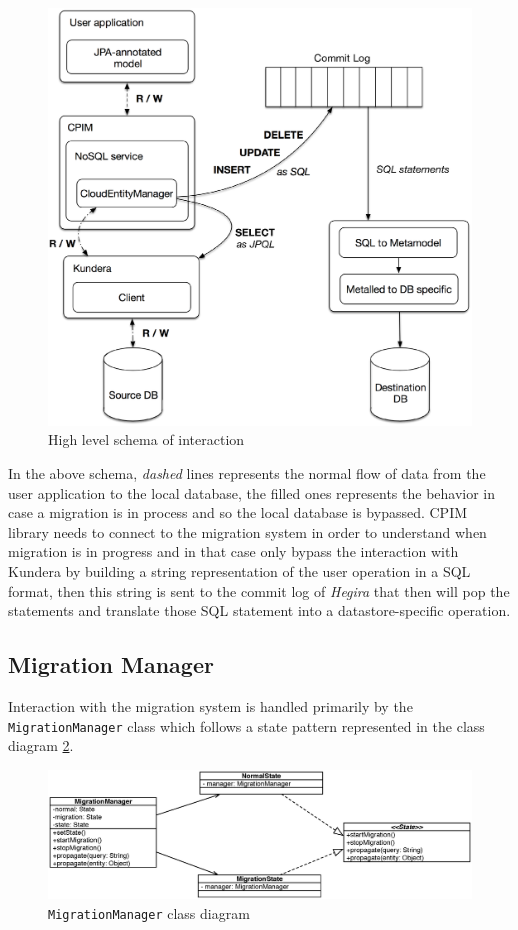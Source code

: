 \begin{figure}[tbh]
  \centering
  \includegraphics[width=12cm]{images/high_level_interaction}
  \caption{High level schema of interaction}
  \label{fig:high-level-interaction}
\end{figure} 

\noindent In the above schema, \textit{dashed} lines represents the normal flow of data from the user application to the local database, the filled ones represents the behavior in case a migration is in process and so the local database is bypassed. CPIM library needs to connect to the migration system in order to understand when migration is in progress and in that case only bypass the interaction with Kundera by building a string representation of the user operation in a SQL format, then this string is sent to the commit log of \textit{Hegira} that then will pop the statements and translate those SQL statement into a datastore-specific operation.

\subsection{Migration Manager}
Interaction with the migration system is handled primarily by the \texttt{MigrationManager} class which follows a state pattern represented in the class diagram \ref{fig:migration-class-diagram}. 
 
\begin{figure}[tbh]
  \centering
  \includegraphics[width=14cm]{images/migration_class_diagram}
  \caption{\texttt{MigrationManager} class diagram}
  \label{fig:migration-class-diagram}
\end{figure} 

